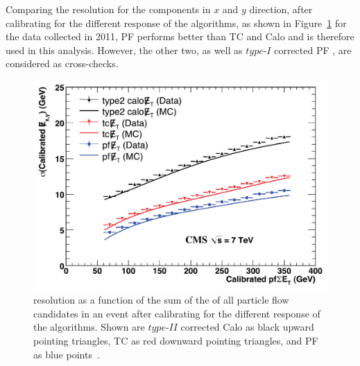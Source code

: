 Comparing the resolution for the \MET components in $x$ and $y$ direction, after calibrating for the different response of the algorithms, as shown in Figure~\ref{fig:METReso} for the data collected in 2011, PF \MET performs better than TC and Calo \MET and is therefore used in this analysis. However, the other two, as well as $\textit{type-I}$ corrected PF \MET, are considered as cross-checks. 
\begin{figure}[htb]
\begin{center}
\includegraphics[scale=0.2]{plots/RECO/METResolution.png}
\caption{\MET resolution as a function of the sum of the \Et of all particle flow candidates in an event after calibrating for the different response of the algorithms. Shown are $\textit{type-II}$ corrected Calo \MET as black upward pointing triangles, TC \MET as red downward pointing triangles, and PF \MET as blue points~\cite{7TeVMETPaper}.}
\label{fig:METReso}
\end{center}
\end{figure}



